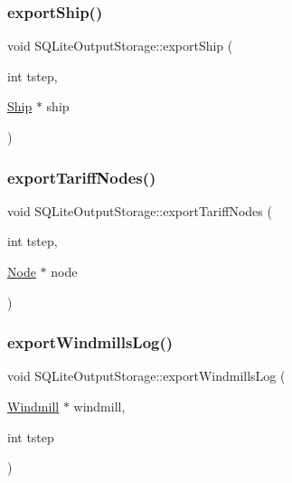 \mbox{\label{class_s_q_lite_output_storage_ab963baf95a340d450b308cdf7e48e34a}} 
\subsubsection{\texorpdfstring{exportShip()}{exportShip()}}
{\footnotesize\ttfamily void S\+Q\+Lite\+Output\+Storage\+::export\+Ship (\begin{DoxyParamCaption}\item[{int}]{tstep,  }\item[{\mbox{\hyperlink{class_ship}{Ship}} $\ast$}]{ship }\end{DoxyParamCaption})}

\mbox{\label{class_s_q_lite_output_storage_a46e7b80c24e629cb8a8223e4a71a96d7}} 
\subsubsection{\texorpdfstring{exportTariffNodes()}{exportTariffNodes()}}
{\footnotesize\ttfamily void S\+Q\+Lite\+Output\+Storage\+::export\+Tariff\+Nodes (\begin{DoxyParamCaption}\item[{int}]{tstep,  }\item[{\mbox{\hyperlink{class_node}{Node}} $\ast$}]{node }\end{DoxyParamCaption})}

\mbox{\label{class_s_q_lite_output_storage_a7d415c5a0459b81b43c47649d3f0d349}} 
\subsubsection{\texorpdfstring{exportWindmillsLog()}{exportWindmillsLog()}}
{\footnotesize\ttfamily void S\+Q\+Lite\+Output\+Storage\+::export\+Windmills\+Log (\begin{DoxyParamCaption}\item[{\mbox{\hyperlink{class_windmill}{Windmill}} $\ast$}]{windmill,  }\item[{int}]{tstep }\end{DoxyParamCaption})}

